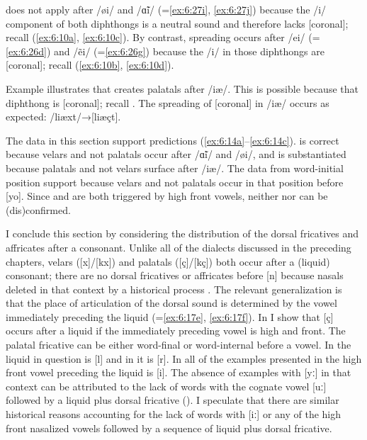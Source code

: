  does not apply after /øi/ and /\~ɑi/ (=\ref{ex:6:27i}, \ref{ex:6:27j}) because the /i/ component of both diphthongs is a neutral sound and therefore lacks [coronal]; recall (\ref{ex:6:10a}, \ref{ex:6:10c}). By contrast, spreading occurs after /ei/ (=\ref{ex:6:26d}) and /ẽi/ (=\ref{ex:6:26g}) because the /i/ in those diphthongs are [coronal]; recall (\ref{ex:6:10b}, \ref{ex:6:10d}).

Example  illustrates that  creates palatals after /iæ/. This is possible because that diphthong is [coronal]; recall . The spreading of [coronal] in /iæ/ occurs as expected: /liæxt/→[liæçt].

The data in this section support predictions (\ref{ex:6:14a}--\ref{ex:6:14c}).  is correct because velars and not palatals occur after /\~ɑi/ and /øi/, and  is substantiated because palatals and not velars surface after /iæ/. The data from word-initial position support  because velars and not palatals occur in that position before [yo]. Since  and  are both triggered by high front vowels, neither  nor  can be (dis)confirmed.

I conclude this section by considering the distribution of the dorsal fricatives and affricates after a consonant. Unlike all of the dialects discussed in the preceding chapters, velars ([x]/[kx]) and palatals ([ç]/[kç]) both occur after a (liquid) consonant; there are no dorsal fricatives or affricates before [n] because nasals deleted in that context by a historical process \citep[44--45]{Wipf1910}. The relevant generalization is that the place of articulation of the dorsal sound is determined by the vowel immediately preceding the liquid (=\ref{ex:6:17e}, \ref{ex:6:17f}). In  I show that [ç] occurs after a liquid if the immediately preceding vowel is high and front. The palatal fricative can be either word-final or word-internal before a vowel. In  the liquid in question is [l] and in  it is [r]. In all of the examples presented in  the high front vowel preceding the liquid is [i]. The absence of examples with [yː] in that context can be attributed to the lack of  words with the cognate vowel [uː] followed by a liquid plus dorsal fricative (). I speculate that there are similar historical reasons accounting for the lack of words with [iː] or any of the high front nasalized vowels followed by a sequence of liquid plus dorsal fricative.

